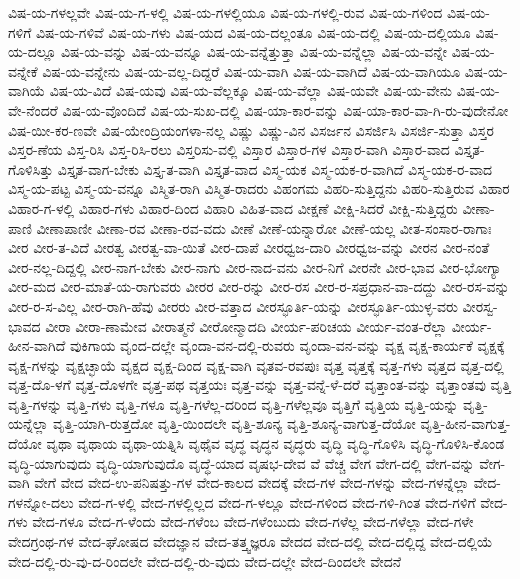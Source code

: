 ವಿಷ-ಯ-ಗಳಲ್ಲವೇ
ವಿಷ-ಯ-ಗ-ಳಲ್ಲಿ
ವಿಷ-ಯ-ಗಳಲ್ಲಿಯೂ
ವಿಷ-ಯ-ಗಳಲ್ಲಿ-ರುವ
ವಿಷ-ಯ-ಗಳಿಂದ
ವಿಷ-ಯ-ಗಳಿಗೆ
ವಿಷ-ಯ-ಗಳಿವೆ
ವಿಷ-ಯ-ಗಳು
ವಿಷ-ಯದ
ವಿಷ-ಯ-ದಲ್ಲಂತೂ
ವಿಷ-ಯ-ದಲ್ಲಿ
ವಿಷ-ಯ-ದಲ್ಲಿಯೂ
ವಿಷ-ಯ-ದಲ್ಲೂ
ವಿಷ-ಯ-ವನ್ನು
ವಿಷ-ಯ-ವನ್ನೂ
ವಿಷ-ಯ-ವನ್ನೆತ್ತುತ್ತಾ
ವಿಷ-ಯ-ವನ್ನೆಲ್ಲಾ
ವಿಷ-ಯ-ವನ್ನೇ
ವಿಷ-ಯ-ವನ್ನೇಕೆ
ವಿಷ-ಯ-ವನ್ನೇನು
ವಿಷ-ಯ-ವಲ್ಲ-ದಿದ್ದರೆ
ವಿಷ-ಯ-ವಾಗಿ
ವಿಷ-ಯ-ವಾಗಿದೆ
ವಿಷ-ಯ-ವಾಗಿಯೂ
ವಿಷ-ಯ-ವಾಗಿಯೆ
ವಿಷ-ಯ-ವಿದೆ
ವಿಷ-ಯವು
ವಿಷ-ಯ-ವೆಲ್ಲಕ್ಕೂ
ವಿಷ-ಯ-ವೆಲ್ಲಾ
ವಿಷ-ಯವೇ
ವಿಷ-ಯ-ವೇನು
ವಿಷ-ಯ-ವೇ-ನೆಂದರೆ
ವಿಷ-ಯ-ವೊಂದಿದೆ
ವಿಷ-ಯ-ಸುಖ-ದಲ್ಲಿ
ವಿಷ-ಯಾ-ಕಾರ-ವನ್ನು
ವಿಷ-ಯಾ-ಕಾರ-ವಾ-ಗಿ-ರು-ವುದೇನೋ
ವಿಷ-ಯೀ-ಕರ-ಣವೇ
ವಿಷ-ಯೇಂದ್ರಿಯಂಗಳಾ-ನಲ್ಲ
ವಿಷ್ಣು
ವಿಷ್ಣು-ವಿನ
ವಿಸರ್ಜನ
ವಿಸರ್ಜಿಸಿ
ವಿಸರ್ಜಿ-ಸುತ್ತಾ
ವಿಸ್ತರ
ವಿಸ್ತರ-ಣೆಯ
ವಿಸ್ತ-ರಿಸಿ
ವಿಸ್ತ-ರಿಸಿ-ರಲು
ವಿಸ್ತರಿಸು-ವಲ್ಲಿ
ವಿಸ್ತಾರ
ವಿಸ್ತಾರ-ಗಳ
ವಿಸ್ತಾರ-ವಾಗಿ
ವಿಸ್ತಾರ-ವಾದ
ವಿಸ್ತೃತ-ಗೊಳಿಸಿತ್ತು
ವಿಸ್ತೃತ-ವಾಗ-ಬೇಕು
ವಿಸ್ತೃ-ತ-ವಾಗಿ
ವಿಸ್ತೃತ-ವಾದ
ವಿಸ್ಮ-ಯಕ
ವಿಸ್ಮ-ಯಕ-ರ-ವಾಗಿದೆ
ವಿಸ್ಮ-ಯಕ-ರ-ವಾದ
ವಿಸ್ಮ-ಯ-ಪಟ್ಟ
ವಿಸ್ಮ-ಯ-ವನ್ನೂ
ವಿಸ್ಮಿತ-ರಾಗಿ
ವಿಸ್ಮಿತ-ರಾದರು
ವಿಹಂಗಮ
ವಿಹರಿ-ಸುತ್ತಿದ್ದನು
ವಿಹರಿ-ಸುತ್ತಿರುವ
ವಿಹಾರ
ವಿಹಾರ-ಗ-ಳಲ್ಲಿ
ವಿಹಾರ-ಗಳು
ವಿಹಾರ-ದಿಂದ
ವಿಹಾರಿ
ವಿಹಿತ-ವಾದ
ವೀಕ್ಷಣೆ
ವೀಕ್ಷಿ-ಸಿದರೆ
ವೀಕ್ಷಿ-ಸುತ್ತಿದ್ದರು
ವೀಣಾ-ಪಾಣಿ
ವೀಣಾಪಾಣೀ
ವೀಣಾ-ರವ
ವೀಣಾ-ರವ-ವದು
ವೀಣೆ
ವೀಣೆ-ಯನ್ನಾರೋ
ವೀಣೆ-ಯಲ್ಲ
ವೀತ-ಸಂಸಾರ-ರಾಗಾಃ
ವೀರ
ವೀರ-ತ-ವಿದೆ
ವೀರತ್ವ
ವೀರತ್ವ-ವಾ-ಯಿತೆ
ವೀರ-ದಾಪೆ
ವೀರಧ್ವಜ-ದಾರಿ
ವೀರಧ್ವಜ-ವನ್ನು
ವೀರನ
ವೀರ-ನಂತೆ
ವೀರ-ನಲ್ಲ-ದಿದ್ದಲ್ಲಿ
ವೀರ-ನಾಗ-ಬೇಕು
ವೀರ-ನಾಗು
ವೀರ-ನಾದ-ವನು
ವೀರ-ನಿಗೆ
ವೀರನೇ
ವೀರ-ಭಾವ
ವೀರ-ಭೋಗ್ಯಾ
ವೀರ-ಮದ
ವೀರ-ಮಾತೆ-ಯ-ರಾಗುವರು
ವೀರರ
ವೀರ-ರನ್ನು
ವೀರ-ರಸ
ವೀರ-ರ-ಸಪ್ರಧಾನ-ವಾ-ದದ್ದು
ವೀರ-ರಸ-ವನ್ನು
ವೀರ-ರ-ಸ-ವಿಲ್ಲ
ವೀರ-ರಾಗಿ-ಹೆವು
ವೀರರು
ವೀರ-ವತ್ತಾದ
ವೀರಸ್ಫೂರ್ತಿ-ಯನ್ನು
ವೀರಸ್ಫೂರ್ತಿ-ಯುಳ್ಳ-ವರು
ವೀರಸ್ವ-ಭಾವದ
ವೀರಾ
ವೀರಾ-ಣಾಮೇವ
ವೀರಾತ್ಮನೆ
ವೀರೋನ್ಮಾದದಿ
ವೀರ್ಯ-ಪರಿಚಯ
ವೀರ್ಯ-ವಂತ-ರೆಲ್ಲಾ
ವೀರ್ಯ-ಹೀನ-ವಾಗಿದೆ
ವುಕಿಗಾಯ
ವೃಂದ-ದಲ್ಲೇ
ವೃಂದಾ-ವನ-ದಲ್ಲಿ-ರುವರು
ವೃಂದಾ-ವನ-ವನ್ನು
ವೃಕ್ಷ
ವೃಕ್ಷ-ಕಾರ್ಯಕೆ
ವೃಕ್ಷಕ್ಕೆ
ವೃಕ್ಷ-ಗಳನ್ನು
ವೃಕ್ಷಚ್ಛಾಯೆ
ವೃಕ್ಷದ
ವೃಕ್ಷ-ದಿಂದ
ವೃಕ್ಷ-ವಾಗಿ
ವೃತವ-ರವಪುಃ
ವೃತ್ತ
ವೃತ್ತಕ್ಕೆ
ವೃತ್ತ-ಗಳು
ವೃತ್ತದ
ವೃತ್ತ-ದಲ್ಲಿ
ವೃತ್ತ-ದೊ-ಳಗೆ
ವೃತ್ತ-ದೊಳಗೇ
ವೃತ್ತ-ಪಥ
ವೃತ್ತಯಃ
ವೃತ್ತ-ವನ್ನು
ವೃತ್ತ-ವನ್ನೆ-ಳೆ-ದರೆ
ವೃತ್ತಾಂತ-ವನ್ನು
ವೃತ್ತಾಂತವು
ವೃತ್ತಿ
ವೃತ್ತಿ-ಗಳನ್ನು
ವೃತ್ತಿ-ಗಳು
ವೃತ್ತಿ-ಗಳೂ
ವೃತ್ತಿ-ಗಳೆಲ್ಲ-ದರಿಂದ
ವೃತ್ತಿ-ಗಳೆಲ್ಲವೂ
ವೃತ್ತಿಗೆ
ವೃತ್ತಿಯ
ವೃತ್ತಿ-ಯನ್ನು
ವೃತ್ತಿ-ಯನ್ನೆಲ್ಲಾ
ವೃತ್ತಿ-ಯಾಗಿ-ರುತ್ತದೋ
ವೃತ್ತಿ-ಯಿಂದಲೇ
ವೃತ್ತಿ-ಶೂನ್ಯ
ವೃತ್ತಿ-ಶೂನ್ಯ-ವಾಗುತ್ತ-ದೆಯೋ
ವೃತ್ತಿ-ಹೀನ-ವಾಗುತ್ತ-ದೆಯೋ
ವೃಥಾ
ವೃಥಾಯ
ವೃಥಾ-ಯತ್ನಿಸಿ
ವೃಥೈವ
ವೃದ್ಧ
ವೃದ್ಧನ
ವೃದ್ಧರು
ವೃದ್ಧಿ
ವೃದ್ಧಿ-ಗೊಳಿಸಿ
ವೃದ್ಧಿ-ಗೊಳಿಸಿ-ಕೊಂಡ
ವೃದ್ಧಿ-ಯಾಗುವುದು
ವೃದ್ಧಿ-ಯಾಗುವುದೊ
ವೃದ್ಧೆ-ಯಾದ
ವೃಷಭ-ದೇವ
ವೆ
ವೆಚ್ಚ
ವೇಗ
ವೇಗ-ದಲ್ಲಿ
ವೇಗ-ವನ್ನು
ವೇಗ-ವಾಗಿ
ವೇಗೆ
ವೇದ
ವೇದ-ಉ-ಪನಿಷತ್ತು-ಗಳ
ವೇದ-ಕಾಲದ
ವೇದಕ್ಕೆ
ವೇದ-ಗಳ
ವೇದ-ಗಳನ್ನು
ವೇದ-ಗಳನ್ನೆಲ್ಲಾ
ವೇದ-ಗಳನ್ನೋ-ದಲು
ವೇದ-ಗ-ಳಲ್ಲಿ
ವೇದ-ಗಳಲ್ಲಿಲ್ಲದ
ವೇದ-ಗ-ಳಲ್ಲೂ
ವೇದ-ಗಳಿಂದ
ವೇದ-ಗಳಿ-ಗಿಂತ
ವೇದ-ಗಳಿಗೆ
ವೇದ-ಗಳು
ವೇದ-ಗಳೂ
ವೇದ-ಗ-ಳೆಂದು
ವೇದ-ಗಳೆಂಬ
ವೇದ-ಗಳೆಂಬುದು
ವೇದ-ಗಳೆಲ್ಲ
ವೇದ-ಗಳೆಲ್ಲಾ
ವೇದ-ಗಳೇ
ವೇದಗ್ರಂಥ-ಗಳ
ವೇದ-ಘೋಷದ
ವೇದಜ್ಞಾನ
ವೇದ-ತತ್ತ್ವಜ್ಞರೂ
ವೇದದ
ವೇದ-ದಲ್ಲಿ
ವೇದ-ದಲ್ಲಿದ್ದ
ವೇದ-ದಲ್ಲಿಯೆ
ವೇದ-ದಲ್ಲಿ-ರು-ವು-ದ-ರಿಂದಲೇ
ವೇದ-ದಲ್ಲಿ-ರು-ವುದು
ವೇದ-ದಲ್ಲೇ
ವೇದ-ದಿಂದಲೇ
ವೇದನೆ
